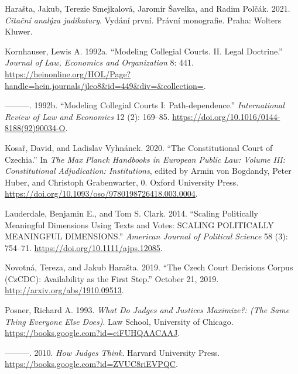 \documentclass[
  11pt,
]{article}
\newlength{\cslhangindent}
\newenvironment{CSLReferences}[2] %
 {%
  \setlength{\parindent}{0pt}
  \ifodd #1 \everypar{\setlength{\hangindent}{\cslhangindent}}\ignorespaces\fi
  \ifnum #2 > 0
  \setlength{\parskip}{#2\baselineskip}
  \fi
 }%
 {}
\begin{document}
\begin{CSLReferences}{1}{0}
\leavevmode{}%
Harašta, Jakub, Terezie Smejkalová, Jaromír Šavelka, and Radim Polčák.
2021. \emph{Citační analýza judikatury}. Vydání první. Právní
monografie. {Praha}: {Wolters Kluwer}.

\leavevmode{}%
Kornhauser, Lewis A. 1992a. {``Modeling {Collegial Courts}. {II}. {Legal
Doctrine}.''} \emph{Journal of Law, Economics and Organization} 8: 441.
\url{https://heinonline.org/HOL/Page?handle=hein.journals/jleo8&id=449&div=&collection=}.

\leavevmode{}%
---------. 1992b. {``Modeling Collegial Courts {I}:
{Path-dependence}.''} \emph{International Review of Law and Economics}
12 (2): 169--85. \url{https://doi.org/10.1016/0144-8188(92)90034-O}.

\leavevmode{}%
Kosař, David, and Ladislav Vyhnánek. 2020. {``The {Constitutional Court}
of {Czechia}.''} In \emph{The {Max Planck Handbooks} in {European Public
Law}: {Volume III}: {Constitutional Adjudication}: {Institutions}},
edited by Armin von Bogdandy, Peter Huber, and Christoph Grabenwarter,
0. {Oxford University Press}.
\url{https://doi.org/10.1093/oso/9780198726418.003.0004}.

\leavevmode{}%
Lauderdale, Benjamin E., and Tom S. Clark. 2014. {``Scaling {Politically
Meaningful Dimensions Using Texts} and {Votes}: {SCALING POLITICALLY
MEANINGFUL DIMENSIONS}.''} \emph{American Journal of Political Science}
58 (3): 754--71. \url{https://doi.org/10.1111/ajps.12085}.

\leavevmode{}%
Novotná, Tereza, and Jakub Harašta. 2019. {``The {Czech Court Decisions
Corpus} ({CzCDC}): {Availability} as the {First Step}.''} October 21,
2019. \url{http://arxiv.org/abs/1910.09513}.

\leavevmode{}%
Posner, Richard A. 1993. \emph{What {Do Judges} and {Justices
Maximize}?: (The {Same Thing Everyone Else Does})}. {Law School,
University of Chicago}. \url{https://books.google.com?id=ciFUHQAACAAJ}.

\leavevmode{}%
---------. 2010. \emph{How {Judges Think}}. {Harvard University Press}.
\url{https://books.google.com?id=ZVUC8riEVPQC}.


\end{CSLReferences}
\end{document}
